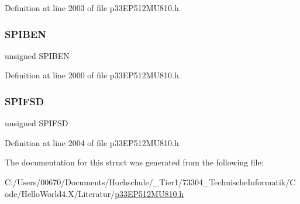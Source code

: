 Definition at line 2003 of file p33\+E\+P512\+M\+U810.\+h.

\mbox{\label{structtag_s_p_i2_c_o_n2_b_i_t_s_a48f1b49d7589da2ee8c38cd6d820a542}} 
\subsubsection{\texorpdfstring{S\+P\+I\+B\+EN}{SPIBEN}}
{\footnotesize\ttfamily unsigned S\+P\+I\+B\+EN}



Definition at line 2000 of file p33\+E\+P512\+M\+U810.\+h.

\mbox{\label{structtag_s_p_i2_c_o_n2_b_i_t_s_aeb3b552a9f7c25bc1ae09655904e34cc}} 
\subsubsection{\texorpdfstring{S\+P\+I\+F\+SD}{SPIFSD}}
{\footnotesize\ttfamily unsigned S\+P\+I\+F\+SD}



Definition at line 2004 of file p33\+E\+P512\+M\+U810.\+h.



The documentation for this struct was generated from the following file\+:\begin{DoxyCompactItemize}
\item 
C\+:/\+Users/00670/\+Documents/\+Hochschule/\+\_\+\+Tier1/73304\+\_\+\+Technische\+Informatik/\+Code/\+Hello\+World4.\+X/\+Literatur/\hyperlink{p33_e_p512_m_u810_8h}{p33\+E\+P512\+M\+U810.\+h}\end{DoxyCompactItemize}
